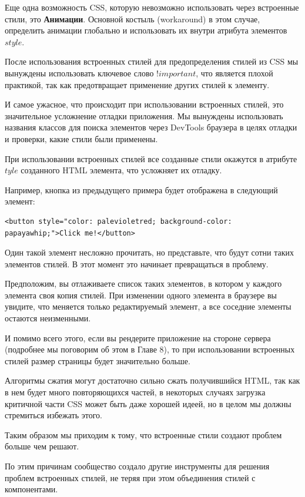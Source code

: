 Еще одна возможность CSS, которую невозможно использовать через встроенные стили, это \textbf{Анимации}. Основной костыль (workaround) в этом случае, определить анимации глобально и использовать их внутри атрибута элементов $style$.

После использования встроенных стилей для предопределения стилей из CSS мы вынуждены использовать ключевое слово $!important$, что является плохой практикой, так как предотвращает применение других стилей к элементу.

И самое ужасное, что происходит при использовании встроенных стилей, это значительное усложнение отладки приложения. Мы вынуждены использовать названия классов для поиска элементов через DevTools браузера в целях отладки и проверки, какие стили были применены.

При использовании встроенных стилей все созданные стили окажутся в атрибуте $tyle$ созданного HTML элемента, что усложняет их отладку.

Например, кнопка из предыдущего примера будет отображена в следующий элемент:

\begin{lstlisting}
<button style="color: palevioletred; background-color: papayawhip;">Click me!</button>
\end{lstlisting}

Один такой элемент несложно прочитать, но представьте, что будут сотни таких элементов стилей. В этот момент это начинает превращаться в проблему.

Предположим, вы отлаживаете список таких элементов, в котором у каждого элемента своя копия стилей. При изменении одного элемента в браузере вы увидите, что меняется только редактируемый элемент, а все соседние элементы остаются неизменными. 

И помимо всего этого, если вы рендерите приложение на стороне сервера (подробнее мы поговорим об этом в Главе 8), то при использовании встроенных стилей размер страницы будет значительно больше. 

Алгоритмы сжатия могут достаточно сильно сжать получившийся HTML, так как в нем будет много повторяющихся частей, в некоторых случаях загрузка критичной части CSS может быть даже хорошей идеей, но в целом мы должны стремиться избежать этого.

Таким образом мы приходим к тому, что встроенные стили создают проблем больше чем решают.

По этим причинам сообщество создало другие инструменты для решения проблем встроенных стилей, не теряя при этом объединения стилей с компонентами. 

